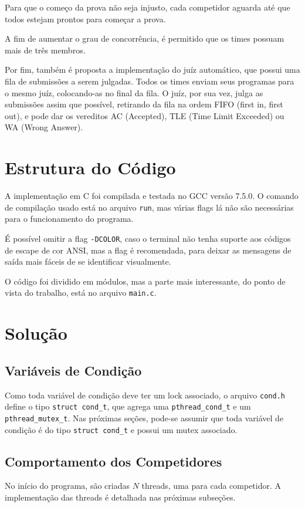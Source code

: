 \documentclass[11pt]{article}
\newcommand{\code}{\lstinline[mathescape=true]}
\begin{document}
Para que o começo da prova não seja injusto, cada competidor aguarda até que todos estejam prontos
para começar a prova.

A fim de aumentar o grau de concorrência, é permitido que os times possuam mais de três membros.

Por fim, também é proposta a implementação do juíz automático, que possui uma fila de submissões a
serem julgadas. Todos os times enviam seus programas para o mesmo juíz, colocando-as no final da
fila. O juíz, por sua vez, julga as submissões assim que possível, retirando da fila na ordem FIFO
(first in, first out), e pode dar os vereditos AC (Accepted), TLE (Time Limit Exceeded) ou WA (Wrong
Answer).

\section{Estrutura do Código}
A implementação em C foi compilada e testada no GCC versão 7.5.0. O comando de compilação usado está no
arquivo \code{run}, mas várias flags lá não são necessárias para o funcionamento do programa. 

É possível omitir a flag \code{-DCOLOR}, caso o terminal não tenha suporte aos códigos de escape de
cor ANSI\cite{ansi_color}, mas a flag é recomendada, para deixar as mensagens de saída mais fáceis de
se identificar visualmente.

O código foi dividido em módulos, mas a parte mais interessante, do ponto de vista do trabalho, está
no arquivo \code{main.c}.

\section{Solução}

\subsection{Variáveis de Condição}
Como toda variável de condição deve ter um lock associado, o arquivo \code{cond.h} define o tipo
\code{struct cond_t}, que agrega uma \code{pthread_cond_t} e um \code{pthread_mutex_t}. Nas próximas
seções, pode-se assumir que toda variável de condição é do tipo \code{struct cond_t} e possui um
mutex associado.

\subsection{Comportamento dos Competidores}
No início do programa, são criadas $N$ threads, uma para cada competidor. A implementação das threads é
detalhada nas próximas subseções.
\end{document}
